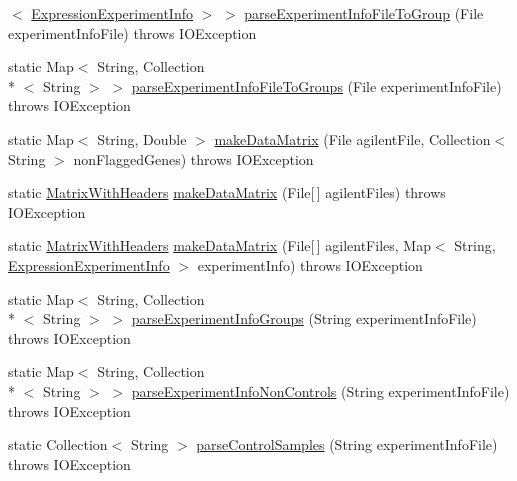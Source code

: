 \begin{DoxyCompactItemize}
$<$ \hyperlink{classbroad_1_1pda_1_1geneexpression_1_1_expression_experiment_info}{Expression\+Experiment\+Info} $>$ $>$ \hyperlink{classbroad_1_1pda_1_1geneexpression_1_1agilent_1_1_agilent_utils_aeb55fd621f1f014dca4de88a2d7c753b}{parse\+Experiment\+Info\+File\+To\+Group} (File experiment\+Info\+File)  throws I\+O\+Exception 
\item 
static Map$<$ String, Collection\\*
$<$ String $>$ $>$ \hyperlink{classbroad_1_1pda_1_1geneexpression_1_1agilent_1_1_agilent_utils_a10f5e802dfc7a44ff22cba126cbfb1f4}{parse\+Experiment\+Info\+File\+To\+Groups} (File experiment\+Info\+File)  throws I\+O\+Exception 
\item 
static Map$<$ String, Double $>$ \hyperlink{classbroad_1_1pda_1_1geneexpression_1_1agilent_1_1_agilent_utils_a750231ef289737258a8ce9d3e6daac54}{make\+Data\+Matrix} (File agilent\+File, Collection$<$ String $>$ non\+Flagged\+Genes)  throws I\+O\+Exception
\item 
static \hyperlink{classbroad_1_1core_1_1datastructures_1_1_matrix_with_headers}{Matrix\+With\+Headers} \hyperlink{classbroad_1_1pda_1_1geneexpression_1_1agilent_1_1_agilent_utils_ab3c378a4a1579f691e2df6d6c0d84520}{make\+Data\+Matrix} (File\mbox{[}$\,$\mbox{]} agilent\+Files)  throws I\+O\+Exception
\item 
static \hyperlink{classbroad_1_1core_1_1datastructures_1_1_matrix_with_headers}{Matrix\+With\+Headers} \hyperlink{classbroad_1_1pda_1_1geneexpression_1_1agilent_1_1_agilent_utils_a18a5ac92f3af0973a4b807d25c15209b}{make\+Data\+Matrix} (File\mbox{[}$\,$\mbox{]} agilent\+Files, Map$<$ String, \hyperlink{classbroad_1_1pda_1_1geneexpression_1_1_expression_experiment_info}{Expression\+Experiment\+Info} $>$ experiment\+Info)  throws I\+O\+Exception
\item 
static Map$<$ String, Collection\\*
$<$ String $>$ $>$ \hyperlink{classbroad_1_1pda_1_1geneexpression_1_1agilent_1_1_agilent_utils_abcf3cad1656d8f0ab136fcc4d0004965}{parse\+Experiment\+Info\+Groups} (String experiment\+Info\+File)  throws I\+O\+Exception 
\item 
static Map$<$ String, Collection\\*
$<$ String $>$ $>$ \hyperlink{classbroad_1_1pda_1_1geneexpression_1_1agilent_1_1_agilent_utils_a9b3d2f9727de7e1158acc2e70f2b80be}{parse\+Experiment\+Info\+Non\+Controls} (String experiment\+Info\+File)  throws I\+O\+Exception 
\item 
static Collection$<$ String $>$ \hyperlink{classbroad_1_1pda_1_1geneexpression_1_1agilent_1_1_agilent_utils_ae48cb05c0a5f5374eb761c25cafa5d93}{parse\+Control\+Samples} (String experiment\+Info\+File)  throws I\+O\+Exception 
\end{DoxyCompactItemize}



